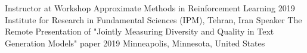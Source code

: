 

\begin{cventries}
	\cventry
	{Instructor at Workshop} %
	{Approximate Methods in Reinforcement Learning} %
	{2019} %
	{} %
	{Institute for Research in Fundamental Sciences (IPM), Tehran, Iran}
    \vspace{.5cm}
	\cventry
	{Speaker} %
	{The Remote Presentation of "Jointly Measuring Diversity and Quality in Text Generation Models" paper} %
	{2019} %
	{} %
	{Minneapolis, Minnesota, United States}
\end{cventries}

\iffalse
\cvsubsection{Department and Lab Presentations}
\begin{cvhonors}
	\cvhonor
	{From VAE to WAE
in Language Modeling}
	{Lab Paper Reading Sessions}
	{}
	{2019}
	\cvhonor
	{From BERT to XLNet}
	{Lab Paper Reading Sessions}
	{}
	{2019}
	\cvhonor
	{GANs, IRL, EBMs}
	{Department Paper Reading Sessions}
	{}
	{2018}
	\cvhonor
	{The KL Collapse Story of VAEs in Text}
	{Lab Paper Reading Sessions}
	{}
	{2019, 2018}
\end{cvhonors}
\fi